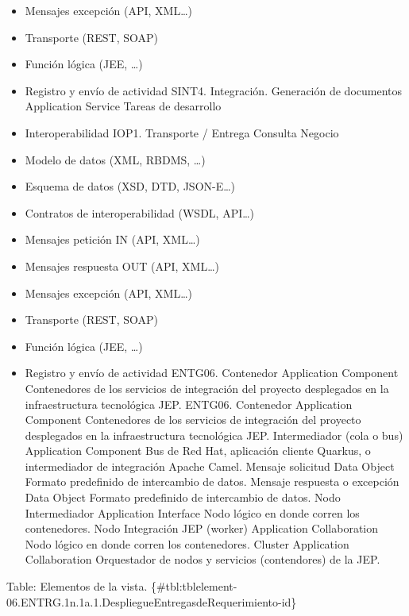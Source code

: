 \documentclass[
  paper=a4,
  ,captions=tableheading
]{scrartcl}
\begin{document}
\begin{itemize}
\item
  Mensajes excepción (API, XML\ldots)
\item
  Transporte (REST, SOAP)
\item
  Función lógica (JEE, \ldots)
\item
  Registro y envío de actividad \textbar{} \textbar{} SINT4.
  Integración. Generación de documentos \textbar{} Application Service
  \textbar{} Tareas de desarrollo
\item
  Interoperabilidad IOP1. Transporte / Entrega Consulta Negocio
\item
  Modelo de datos (XML, RBDMS, \ldots)
\item
  Esquema de datos (XSD, DTD, JSON-E\ldots)
\item
  Contratos de interoperabilidad (WSDL, API\ldots)
\item
  Mensajes petición IN (API, XML\ldots)
\item
  Mensajes respuesta OUT (API, XML\ldots)
\item
  Mensajes excepción (API, XML\ldots)
\item
  Transporte (REST, SOAP)
\item
  Función lógica (JEE, \ldots)
\item
  Registro y envío de actividad \textbar{} \textbar{} ENTG06. Contenedor
  \textbar{} Application Component \textbar{} Contenedores de los
  servicios de integración del proyecto desplegados en la
  infraestructura tecnológica JEP. \textbar{} \textbar{} ENTG06.
  Contenedor \textbar{} Application Component \textbar{} Contenedores de
  los servicios de integración del proyecto desplegados en la
  infraestructura tecnológica JEP. \textbar{} \textbar{} Intermediador
  (cola o bus) \textbar{} Application Component \textbar{} Bus de Red
  Hat, aplicación cliente Quarkus, o intermediador de integración Apache
  Camel. \textbar{} \textbar{} Mensaje solicitud \textbar{} Data Object
  \textbar{} Formato predefinido de intercambio de datos. \textbar{}
  \textbar{} Mensaje respuesta o excepción \textbar{} Data Object
  \textbar{} Formato predefinido de intercambio de datos. \textbar{}
  \textbar{} Nodo Intermediador \textbar{} Application Interface
  \textbar{} Nodo lógico en donde corren los contenedores. \textbar{}
  \textbar{} Nodo Integración JEP (worker) \textbar{} Application
  Collaboration \textbar{} Nodo lógico en donde corren los contenedores.
  \textbar{} \textbar{} Cluster \textbar{} Application Collaboration
  \textbar{} Orquestador de nodos y servicios (contendores) de la JEP.
  \textbar{}
\end{itemize}

Table: Elementos de la vista.
\{\#tbl:tblelement-06.ENTRG.1n.1a.1.DespliegueEntregasdeRequerimiento-id\}
\end{document}
